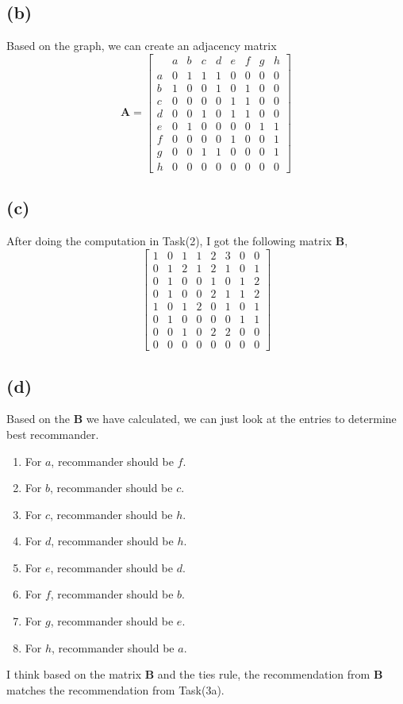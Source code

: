 \documentclass{article}
\newcommand{\mat}[1]{\mathbf{#1}}
\begin{document}
\subsection*{(b)}
Based on the graph, we can create an adjacency matrix 
$$\mat{A} = \begin{bmatrix}
    \ & a & b & c & d & e & f & g & h \\
    a & 0 & 1 & 1 & 1 & 0 & 0 & 0 & 0 \\
    b & 1 & 0 & 0 & 1 & 0 & 1 & 0 & 0 \\
    c & 0 & 0 & 0 & 0 & 1 & 1 & 0 & 0 \\
    d & 0 & 0 & 1 & 0 & 1 & 1 & 0 & 0 \\
    e & 0 & 1 & 0 & 0 & 0 & 0 & 1 & 1 \\
    f & 0 & 0 & 0 & 0 & 1 & 0 & 0 & 1 \\
    g & 0 & 0 & 1 & 1 & 0 & 0 & 0 & 1 \\
    h & 0 & 0 & 0 & 0 & 0 & 0 & 0 & 0 
\end{bmatrix}
$$
\subsection*{(c)}
After doing the computation in Task(2), I got the following matrix $\mat{B}$,
$$\begin{bmatrix}
1& 0 &1& 1& 2& 3& 0& 0\\
0& 1& 2& 1& 2& 1& 0& 1\\
0& 1& 0& 0& 1& 0& 1& 2\\
0& 1& 0& 0& 2& 1& 1& 2\\
1& 0& 1& 2& 0& 1& 0& 1\\
0& 1& 0& 0& 0& 0& 1& 1\\
0& 0& 1& 0& 2& 2& 0& 0\\
0& 0& 0& 0& 0& 0& 0& 0
\end{bmatrix}$$
\subsection*{(d)}
Based on the $\mat{B}$ we have calculated, we can just look
at the entries to determine best recommander.
\begin{enumerate}
    \item For $a$, recommander should be $f$.
    \item For $b$, recommander should be $c$.
    \item For $c$, recommander should be $h$.
    \item For $d$, recommander should be $h$.
    \item For $e$, recommander should be $d$.
    \item For $f$, recommander should be $b$.
    \item For $g$, recommander should be $e$.
    \item For $h$, recommander should be $a$.
\end{enumerate}
I think based on the matrix $\mat{B}$ and the ties rule, the recommendation from $\mat{B}$
matches the recommendation from Task(3a).
\end{document}
